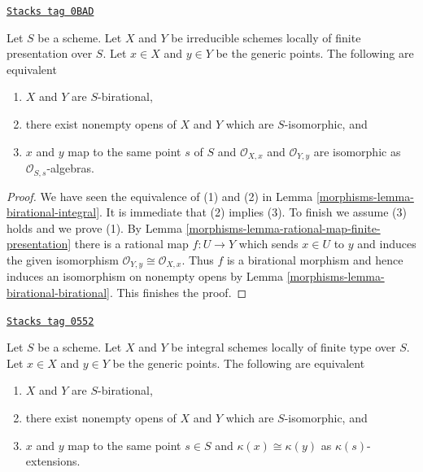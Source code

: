 \begin{lemma}
\label{morphisms-lemma-criterion-birational-finite-presentation}
\href{https://stacks.math.columbia.edu/tag/0BAD}{\texttt{Stacks tag 0BAD}}

Let $S$ be a scheme. Let $X$ and $Y$ be irreducible schemes
locally of finite presentation over $S$. Let $x \in X$ and $y \in Y$
be the generic points. The following are equivalent
\begin{enumerate}
\item $X$ and $Y$ are $S$-birational,
\item there exist nonempty opens of $X$ and $Y$
which are $S$-isomorphic, and
\item $x$ and $y$ map to the same point $s$ of $S$ and
$\mathcal{O}_{X, x}$ and $\mathcal{O}_{Y, y}$ are isomorphic as
$\mathcal{O}_{S, s}$-algebras.
\end{enumerate}
\end{lemma}

\begin{proof}

We have seen the equivalence of (1) and (2) in
Lemma \ref{morphisms-lemma-birational-integral}.
It is immediate that (2) implies (3).
To finish we assume (3) holds and we prove (1).
By Lemma \ref{morphisms-lemma-rational-map-finite-presentation}
there is a rational map $f : U \to Y$
which sends $x \in U$ to $y$ and induces
the given isomorphism $\mathcal{O}_{Y, y} \cong \mathcal{O}_{X, x}$.
Thus $f$ is a birational morphism and hence induces
an isomorphism on nonempty opens
by Lemma \ref{morphisms-lemma-birational-birational}.
This finishes the proof.
\end{proof}

\begin{lemma}
\label{morphisms-lemma-common-open}
\href{https://stacks.math.columbia.edu/tag/0552}{\texttt{Stacks tag 0552}}

Let $S$ be a scheme. Let $X$ and $Y$ be integral schemes locally
of finite type over $S$. Let $x \in X$ and $y \in Y$ be the generic points.
The following are equivalent
\begin{enumerate}
\item $X$ and $Y$ are $S$-birational,
\item there exist nonempty opens of $X$ and $Y$ which are $S$-isomorphic, and
\item $x$ and $y$ map to the same point $s \in S$ and
$\kappa(x) \cong \kappa(y)$ as $\kappa(s)$-extensions.
\end{enumerate}
\end{lemma}

